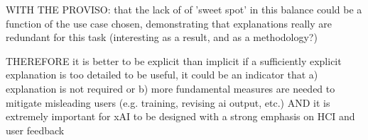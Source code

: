 WITH THE PROVISO: that the lack of of 'sweet spot' in this balance could be a function of the use case chosen, demonstrating that explanations really are redundant for this task (interesting as a result, and as a methodology?)

THEREFORE
it is better to be explicit than implicit
if a sufficiently explicit explanation is too detailed to be useful, it could be an indicator that a) explanation is not required or b) more fundamental measures are needed to mitigate misleading users (e.g. training, revising ai output, etc.)
AND
it is extremely important for xAI to be designed with a strong emphasis on HCI and user feedback






